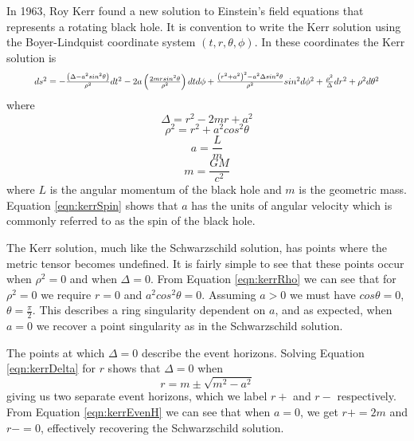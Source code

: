 \documentclass[12pt, oneside]{smuthesis}
\begin{document}
In 1963, Roy Kerr found a new solution to Einstein's field equations that represents a rotating black hole. It is convention to write the Kerr solution using the Boyer-Lindquist coordinate system $(t, r, \theta, \phi)$. In these coordinates the Kerr solution is
\begin{equation}\label{eqn:kerrMetric}
\resizebox{0.9\textwidth}{!}{$
ds^{2}=-\frac{\left(\Delta-a^{2}sin^{2}\theta\right)}{\rho^{2}}dt^{2}-2a\left(\frac{2mrsin^{2}\theta}{\rho^{2}}\right)dtd\phi+\frac{\left(r^{2}+a^{2}\right)^{2}-a^{2}\Delta sin^{2}\theta}{\rho^{2}}sin^{2}d\phi^{2}+\frac{\rho^{2}}{\Delta}dr^{2}+\rho^{2}d\theta^{2}
$}
\end{equation}
where
\begin{equation}\label{eqn:kerrDelta}
\Delta=r^{2}-2mr+a^{2}
\end{equation}
\begin{equation}\label{eqn:kerrRho}
\rho^{2}=r^{2}+a^{2}cos^{2}\theta
\end{equation}
\begin{equation}\label{eqn:kerrSpin}
a=\frac{L}{m}
\end{equation}
\begin{equation}\label{eqn:geomMass}
m=\frac{GM}{c^{2}}
\end{equation}
where $L$ is the angular momentum of the black hole and $m$ is the geometric mass. Equation \ref{eqn:kerrSpin} shows that $a$ has the units of angular velocity which is commonly referred to as the spin of the black hole.

The Kerr solution, much like the Schwarzschild solution, has points where the metric tensor becomes undefined. It is fairly simple to see that these points occur when $\rho^{2}=0$ and when $\Delta=0$. From Equation \ref{eqn:kerrRho} we can see that for $\rho^{2}=0$ we require $r=0$ and $a^{2}cos^{2}\theta=0$. Assuming $a>0$ we must have $cos\theta=0$, $\theta=\frac{\pi}{2}$. This describes a ring singularity dependent on $a$, and as expected, when $a=0$ we recover a point singularity as in the Schwarzschild solution.

The points at which $\Delta=0$ describe the event horizons. Solving Equation \ref{eqn:kerrDelta} for $r$ shows that $\Delta=0$ when
\begin{equation}\label{eqn:kerrEvenH}
r=m\pm\sqrt{m^{2}-a^{2}}
\end{equation}
giving us two separate event horizons, which we label $r+$ and $r-$ respectively. From Equation \ref{eqn:kerrEvenH} we can see that when $a=0$, we get $r+=2m$ and $r-=0$, effectively recovering the Schwarzschild solution. 
\end{document}
